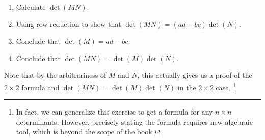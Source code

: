 \begin{exercises}
\begin{problist}
      \begin{enumerate}
        \item Calculate \(\det(MN)\).
        \item Using row reduction to show that \(\det(MN)=(ad-bc)\det(N)\).
        \item Conclude that \(\det(M)=ad-bc\).
        \item Conclude that \(\det(MN)=\det(M)\det(N)\).
      \end{enumerate}
      Note that by the arbitrariness of \(M\) and \(N\), this actually gives us a proof of the \(2\times 2\) formula and \(\det(MN)=\det(M)\det(N)\) in the \(2\times 2\) case. \footnote{In fact, we can generalize this exercise to get a formula for any \(n\times n\) determinants. However, precisely stating the formula requires new algebraic tool, which is beyond the scope of the book.}
\end{problist}
\end{exercises} 
\renewcommand{\Row}{\operatorname{row}}
\renewcommand{\Col}{\operatorname{col}}